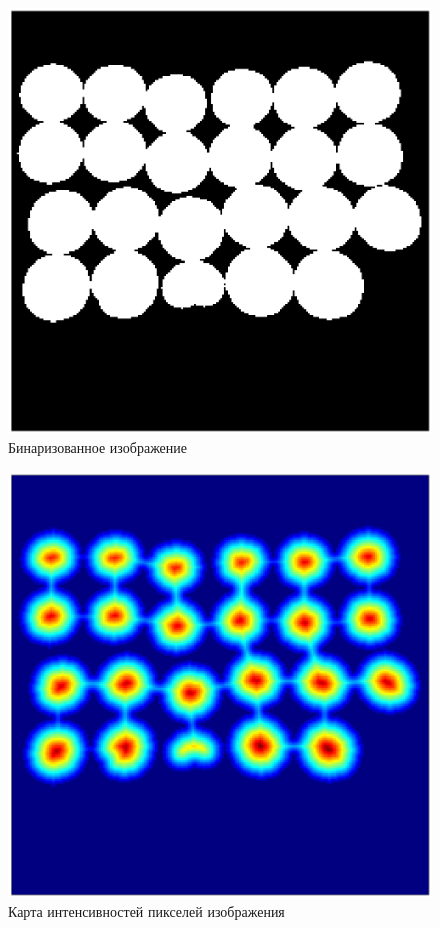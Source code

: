 \begin{figure}[H]
    \includegraphics[width=\textwidth]{../outputs/3_filtr.png}
    \caption{Бинаризованное изображение}
\end{figure}

\begin{figure}[H]
    \includegraphics[width=\textwidth]{../outputs/3_map_of_heights.png}
    \caption{Карта интенсивностей пикселей изображения}
\end{figure}

